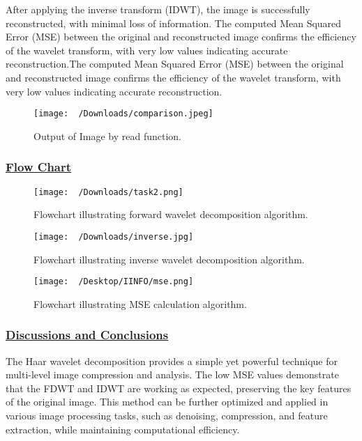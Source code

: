 \documentclass[
  11pt,
]{article}
\begin{document}
After applying the inverse transform (IDWT), the image is successfully
reconstructed, with minimal loss of information. The computed Mean
Squared Error (MSE) between the original and reconstructed image
confirms the efficiency of the wavelet transform, with very low values
indicating accurate reconstruction.The computed Mean Squared Error (MSE)
between the original and reconstructed image confirms the efficiency of
the wavelet transform, with very low values indicating accurate
reconstruction.

\begin{figure}[H]
\centering
\texttt{[image: ~/Downloads/comparison.jpeg]}
\caption{Output of Image by read function.}
\label{fig:flowchart}
\end{figure}

\subsubsection*{\underline{Flow Chart}}
\begin{figure}[H]
\centering
\texttt{[image: ~/Downloads/task2.png]}
\caption{Flowchart illustrating forward wavelet decomposition algorithm.}
\label{fig:flowchart}
\end{figure}

\begin{figure}[H]
\centering
\texttt{[image: ~/Downloads/inverse.jpg]}
\caption{Flowchart illustrating inverse wavelet decomposition algorithm.}
\end{figure}

\begin{figure}[H]
\centering
\texttt{[image: ~/Desktop/IINFO/mse.png]}
\caption{Flowchart illustrating MSE calculation algorithm.}
\end{figure}

\subsubsection*{\underline{Discussions and Conclusions}}

The Haar wavelet decomposition provides a simple yet powerful technique
for multi-level image compression and analysis. The low MSE values
demonstrate that the FDWT and IDWT are working as expected, preserving
the key features of the original image. This method can be further
optimized and applied in various image processing tasks, such as
denoising, compression, and feature extraction, while maintaining
computational efficiency.
\end{document}
